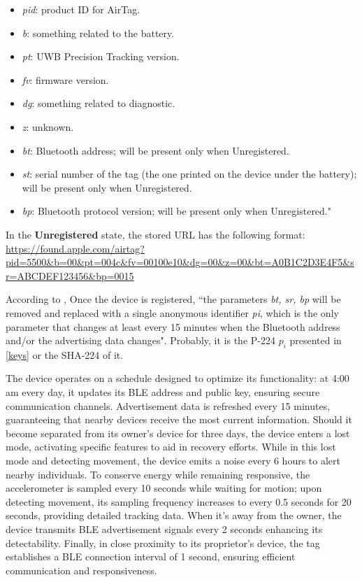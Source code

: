 \documentclass[english]{article}
\begin{document}
\begin{itemize}
  \item \textit{pid}: product ID for AirTag.
  \item \textit{b}: something related to the battery.
  \item \textit{pt}: UWB Precision Tracking version.
  \item \textit{fv}: firmware version.
  \item \textit{dg}: something related to diagnostic.
  \item \textit{z}: unknown.
  \item \textit{bt}: Bluetooth address; will be present only when Unregistered.
  \item \textit{st}: serial number of the tag (the one printed on the device under the battery); will be present only when Unregistered.
  \item \textit{bp}: Bluetooth protocol version; will be present only when Unregistered."
\end{itemize}
In the \textbf{Unregistered} state, the stored URL has the following format:
\url{https://found.apple.com/airtag?pid=5500&b=00&pt=004c&fv=00100e10&dg=00&z=00&bt=A0B1C2D3E4F5&sr=ABCDEF123456&bp=0015}

According to \cite{reverse},
Once the device is registered, ``the parameters \textit{bt, sr, bp} will be removed and replaced with a single anonymous identifier \textit{pi}, which is the only parameter that changes at least every 15 minutes when the Bluetooth address and/or the advertising data changes". Probably, it is the P-224 $p_i$ presented in \ref{keys} or the SHA-224 of it. 


The device operates on a schedule designed to optimize its functionality:
at 4:00 am every day, it updates its BLE address and public key, ensuring secure communication channels.
Advertisement data is refreshed every 15 minutes, guaranteeing that nearby devices receive the most current information.
Should it become separated from its owner's device for three days, the device enters a lost mode, activating specific features to aid in recovery efforts.
While in this lost mode and detecting movement, the device emits a noise every 6 hours to alert nearby individuals.
To conserve energy while remaining responsive, the accelerometer is sampled every 10 seconds while waiting for motion; upon detecting movement, its sampling frequency increases to every 0.5 seconds for 20 seconds, providing detailed tracking data.
When it's away from the owner, the device transmits BLE advertisement signals every 2 seconds enhancing its detectability.
Finally, in close proximity to its proprietor's device, the tag establishes a BLE connection interval of 1 second, ensuring efficient communication and responsiveness.
\end{document}
